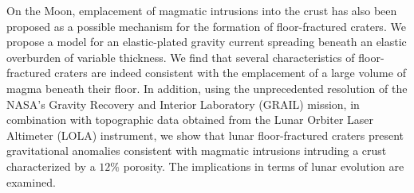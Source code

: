 On the  Moon, emplacement  of magmatic intrusions  into the  crust has
also  been proposed  as  a  possible mechanism  for  the formation  of
floor-fractured  craters.  We  propose a  model for  an elastic-plated
gravity current  spreading beneath  an elastic overburden  of variable
thickness.  We  find that  several characteristics  of floor-fractured
craters are indeed  consistent with the emplacement of  a large volume
of magma  beneath their floor.   In addition, using  the unprecedented
resolution  of the  NASA's  Gravity Recovery  and Interior  Laboratory
(GRAIL) mission,  in combination  with topographic data  obtained from
the  Lunar Orbiter  Laser Altimeter  (LOLA) instrument,  we show  that
lunar   floor-fractured   craters  present   gravitational   anomalies
consistent with magmatic intrusions intruding a crust characterized by
a $12\%$  porosity. The implications  in terms of lunar  evolution are
examined.

